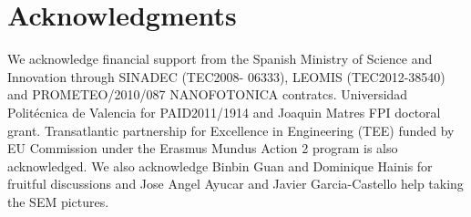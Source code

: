 \section*{Acknowledgments}
We acknowledge financial support from the Spanish Ministry of Science and Innovation through  SINADEC (TEC2008- 06333), LEOMIS (TEC2012-38540) and PROMETEO/2010/087 NANOFOTONICA contratcs. Universidad Polit\'ecnica de Valencia for PAID2011/1914 and  Joaquin Matres FPI doctoral grant. Transatlantic partnership for Excellence in Engineering (TEE) funded by EU Commission under the Erasmus Mundus Action 2 program is also acknowledged.  We also acknowledge Binbin Guan and Dominique Hainis for fruitful discussions and Jose Angel Ayucar and Javier Garcia-Castello help taking the SEM pictures.


% 
% 

